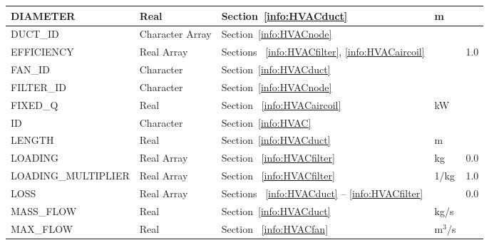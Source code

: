 \documentclass[11pt]{book}
\begin{document}
\begin{longtable}{@{\extracolsep{\fill}}|l|l|l|l|l|}
{\ct DIAMETER}                  & Real              & Section~\ref{info:HVACduct}                                                   &  m            &                \\ \hline
{\ct DUCT\_ID}                  & Character Array   & Section~\ref{info:HVACnode}                                                   &               &                \\ \hline
{\ct EFFICIENCY}                & Real Array        & Sections ~\ref{info:HVACfilter}, \ref{info:HVACaircoil}                       &               & 1.0            \\ \hline
{\ct FAN\_ID}                   & Character         & Section~\ref{info:HVACduct}                                                   &               &                \\ \hline
{\ct FILTER\_ID}                & Character         & Section~\ref{info:HVACnode}                                                   &               &                \\ \hline
{\ct FIXED\_Q}                  & Real              & Section ~\ref{info:HVACaircoil}                                               & kW            &                \\ \hline
{\ct ID}                        & Character         & Section~\ref{info:HVAC}                                                       &               &                \\ \hline
{\ct LENGTH}                    & Real              & Section~\ref{info:HVACduct}                                                   &  m            &                \\ \hline
{\ct LOADING}                   & Real Array        &  Section ~\ref{info:HVACfilter}                                               & kg            & 0.0            \\ \hline
{\ct LOADING\_MULTIPLIER}       & Real Array        &  Section ~\ref{info:HVACfilter}                                               & 1/kg          & 1.0            \\ \hline
{\ct LOSS}                      & Real Array        & Sections ~\ref{info:HVACduct} -- \ref{info:HVACfilter}                        &               & 0.0            \\ \hline
{\ct MASS\_FLOW  }              & Real              & Section~\ref{info:HVACduct}                                                   &  kg/s         &                \\ \hline
{\ct MAX\_FLOW}                 & Real              & Section ~\ref{info:HVACfan}                                                   &  m$^3$/s      &                \\ \hline

\end{longtable}
\end{document}
